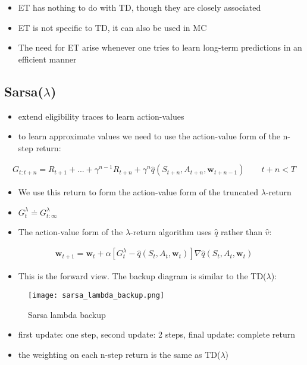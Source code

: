 \documentclass[sutton_barto_notes.tex]{subfiles}
\begin{document}
\begin{itemize}
\item ET has nothing to do with TD, though they are closely associated
\item ET is not specific to TD, it can also be used in MC
\item The need for ET arise whenever one tries to learn long-term predictions in an efficient manner
\end{itemize}

\subsection{Sarsa($\lambda$)}

\begin{itemize}
\item extend eligibility traces to learn action-values 
\item to learn approximate values we need to use the action-value form of the n-step return: 
\end{itemize}
\begin{align}
G_{t:t+n} = R_{t+1} + ... + \gamma^{n-1} R_{t+n} + \gamma^n \hat{q}(S_{t+n}, A_{t+n}, \mathbf{w}_{t+n-1}) \quad \quad t + n < T \label{eq:12.12}\tag{12.12}
\end{align}
\begin{itemize}
\item We use this return to form the action-value form of the truncated $\lambda$-return 
\item $G_t^{\lambda} \doteq G_{t:\infty}^{\lambda}$ 
\item The action-value form of the $\lambda$-return algorithm uses $\hat{q}$ rather than $\hat{v}$: 
\end{itemize}
\begin{align}
\mathbf{w}_{t+1} = \mathbf{w}_{t} + \alpha [G_t^\lambda - \hat{q}(S_t, A_t, \mathbf{w}_{t})] \nabla \hat{q}(S_t, A_t, \mathbf{w}_{t}) \label{eq:12.13}\tag{12.13}
\end{align}
\begin{itemize}
\item This is the forward view. The backup diagram is similar to the TD($\lambda$): 
\end{itemize}
\begin{figure}[h!]
    \centering
     \texttt{[image: sarsa\_lambda\_backup.png]}
    \caption{ Sarsa lambda backup }
\end{figure}
\newpage
\begin{itemize}
\item first update: one step, second update: 2 steps, final update: complete return 
\item the weighting on each n-step return is the same as TD($\lambda$) 
\end{itemize}
\end{document}
